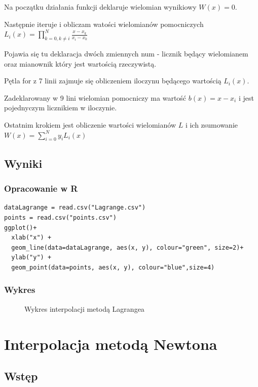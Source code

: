 \documentclass{article}
\begin{document}
    Na początku działania funkcji deklaruje wielomian wynikiowy $W(x)=0$.
    
    Następnie iteruje i obliczam watości wielomianów pomocniczych $L_i(x)=\prod^{N}_{k=0, k\neq i}\frac{x-x_k}{x_i-x_k}$

    Pojawia się tu deklaracja dwóch zmiennych num - licznik będący wielomianem oraz mianownik który jest wartością rzeczywistą.

    Pętla for z 7 linii zajmuje się obliczeniem iloczynu będącego wartością $L_i(x)$.

    Zadeklarowany w 9 lini wielomian pomocniczy ma wartość $b(x)=x-x_i$ i jest pojednyczym licznikiem w iloczynie.

    Ostatnim krokiem jest obliczenie wartości wielomianów $L$ i ich zsumowanie $W(x)=\sum^N_{i=0}y_iL_i(x)$

    \vspace{5px}

    \subsection{Wyniki}
    \subsubsection{Opracowanie w R}
    \lstset {language=R}
    \begin{lstlisting}[caption={Rysowanie wykresu wielomianu}]
dataLagrange = read.csv("Lagrange.csv")
points = read.csv("points.csv")
ggplot()+
  xlab("x") +
  geom_line(data=dataLagrange, aes(x, y), colour="green", size=2)+
  ylab("y") +
  geom_point(data=points, aes(x, y), colour="blue",size=4)
    \end{lstlisting}
    \subsubsection{Wykres}
    \begin{figure}[h]
        \caption{\label{fig:lagrangePlot} Wykres interpolacji metodą Lagrangea}
    \end{figure}

    \pagebreak

    \section{Interpolacja metodą Newtona}
    \subsection{Wstęp}
\end{document}
